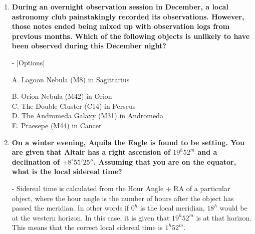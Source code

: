 \documentclass[a4paper,12pt]{extarticle}
\begin{document}
\begin{enumerate}
	\begin{sol}
		- Observe during the peak night(s) of the specific shower!\\
		- Observe from a dark location, preferably when the Moon is not up. This is so as to see as many meteors as possible\\
		- Do not use a telescope/binoculars. Rather, just lie back and scan a large patch of sky (the larger the better) or\\
		- In the Northern Hemisphere, where must one point the polar axis of the equatorial mount towards, such that moving the telescope in Right Ascension will most precisely mimic the motion of the sky over the course of a night?\\ 
		- Generally, observe after local midnight as Earth would usually be moving into the stream of meteors then.\\
		- If possible, observe when the radiant of the shower has a high altitude.
	\end{sol}
	
	\item \textbf{During an overnight observation session in December, a local astronomy club painstakingly recorded its observations. However, those notes ended being mixed up with observation logs from previous months. Which of the following objects is unlikely to have been observed during this December night?}

- [Options] 
\begin{sol}
	A. {\color{red} Lagoon Nebula (M8) in Sagittarius} \quad [$\surd$]
\end{sol}
B. Orion Nebula (M42) in Orion\\
C. The Double Cluster (C14) in Perseus\\
D. The Andromeda Galaxy (M31) in Andromeda\\
E. Praesepe (M44) in Cancer
	
\item \textbf{On a winter evening, Aquila the Eagle is found to be setting. You are given that Altair has a right ascension of $19^h52^m$ and a declination of $+8^\circ55'25''$. Assuming that you are on the equator, what is the local sidereal time?}
\begin{sol}
- Sidereal time is calculated from the Hour Angle + RA of a particular object, where the hour angle is the number of hours after the object has passed the meridian. In other words if $0^h$ is the local meridian, $18^h$ would be at the western horizon. In this case, it is given that $19^h52^m$ is at that horizon. This means that the correct local sidereal time is $1^h52^m$. 	
\end{sol}


\end{enumerate}
\end{document}
